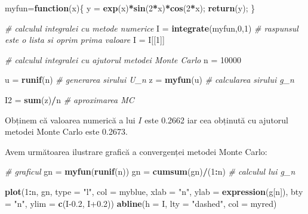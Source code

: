 \documentclass[
]{article}
\newenvironment{Shaded}{\begin{snugshade}}{\end{snugshade}}
\newcommand{\CommentTok}[1]{\textcolor[rgb]{0.56,0.35,0.01}{\textit{#1}}}
\newcommand{\ControlFlowTok}[1]{\textcolor[rgb]{0.13,0.29,0.53}{\textbf{#1}}}
\newcommand{\DataTypeTok}[1]{\textcolor[rgb]{0.13,0.29,0.53}{#1}}
\newcommand{\DecValTok}[1]{\textcolor[rgb]{0.00,0.00,0.81}{#1}}
\newcommand{\FloatTok}[1]{\textcolor[rgb]{0.00,0.00,0.81}{#1}}
\newcommand{\KeywordTok}[1]{\textcolor[rgb]{0.13,0.29,0.53}{\textbf{#1}}}
\newcommand{\NormalTok}[1]{#1}
\newcommand{\OperatorTok}[1]{\textcolor[rgb]{0.81,0.36,0.00}{\textbf{#1}}}
\newcommand{\StringTok}[1]{\textcolor[rgb]{0.31,0.60,0.02}{#1}}
\begin{document}
\begin{Shaded}
\begin{Highlighting}[]
\NormalTok{myfun=}\ControlFlowTok{function}\NormalTok{(x)\{}
\NormalTok{  y =}\StringTok{ }\KeywordTok{exp}\NormalTok{(x)}\OperatorTok{*}\KeywordTok{sin}\NormalTok{(}\DecValTok{2}\OperatorTok{*}\NormalTok{x)}\OperatorTok{*}\KeywordTok{cos}\NormalTok{(}\DecValTok{2}\OperatorTok{*}\NormalTok{x);}
  \KeywordTok{return}\NormalTok{(y);}
\NormalTok{\}}

\CommentTok{# calculul integralei cu metode numerice}
\NormalTok{I =}\StringTok{ }\KeywordTok{integrate}\NormalTok{(myfun,}\DecValTok{0}\NormalTok{,}\DecValTok{1}\NormalTok{) }\CommentTok{# raspunsul este o lista si oprim prima valoare}
\NormalTok{I =}\StringTok{ }\NormalTok{I[[}\DecValTok{1}\NormalTok{]]}

\CommentTok{# calculul integralei cu ajutorul metodei Monte Carlo}
\NormalTok{n =}\StringTok{ }\DecValTok{10000} 

\NormalTok{u =}\StringTok{ }\KeywordTok{runif}\NormalTok{(n) }\CommentTok{# generarea sirului U_n}
\NormalTok{z =}\StringTok{ }\KeywordTok{myfun}\NormalTok{(u) }\CommentTok{# calcularea sirului g_n}

\NormalTok{I2 =}\StringTok{ }\KeywordTok{sum}\NormalTok{(z)}\OperatorTok{/}\NormalTok{n }\CommentTok{# aproximarea MC}
\end{Highlighting}
\end{Shaded}

Obținem că valoarea numerică a lui \(I\) este 0.2662 iar cea obținută cu
ajutorul metodei Monte Carlo este 0.2673.

Avem următoarea ilustrare grafică a convergenței metodei Monte Carlo:

\begin{Shaded}
\begin{Highlighting}[]
\CommentTok{# graficul}
\NormalTok{gn =}\StringTok{ }\KeywordTok{myfun}\NormalTok{(}\KeywordTok{runif}\NormalTok{(n)) }
\NormalTok{gn =}\StringTok{ }\KeywordTok{cumsum}\NormalTok{(gn)}\OperatorTok{/}\NormalTok{(}\DecValTok{1}\OperatorTok{:}\NormalTok{n) }\CommentTok{# calculul lui g_n}

\KeywordTok{plot}\NormalTok{(}\DecValTok{1}\OperatorTok{:}\NormalTok{n, gn, }\DataTypeTok{type =} \StringTok{"l"}\NormalTok{, }
     \DataTypeTok{col =}\NormalTok{ myblue, }\DataTypeTok{xlab =} \StringTok{"n"}\NormalTok{, }
     \DataTypeTok{ylab =} \KeywordTok{expression}\NormalTok{(g[n]),}
     \DataTypeTok{bty =} \StringTok{"n"}\NormalTok{,}
     \DataTypeTok{ylim =} \KeywordTok{c}\NormalTok{(I}\FloatTok{-0.2}\NormalTok{, I}\FloatTok{+0.2}\NormalTok{))}
\KeywordTok{abline}\NormalTok{(}\DataTypeTok{h =}\NormalTok{ I, }\DataTypeTok{lty =} \StringTok{"dashed"}\NormalTok{, }\DataTypeTok{col =}\NormalTok{ myred)}
\end{Highlighting}
\end{Shaded}
\end{document}
